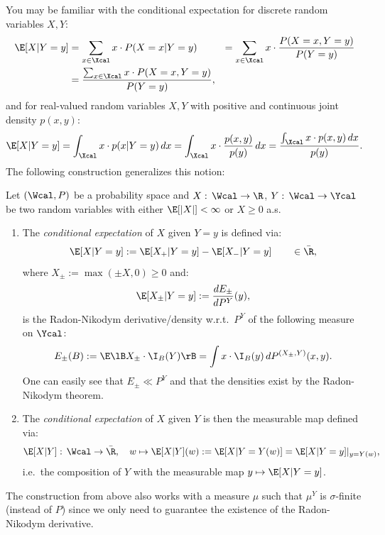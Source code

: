 You may be familiar with the conditional expectation for discrete random variables $X,Y$:
\begin{align*} 
    \E[X|Y=y] &= \sum_{x\in\Xcal} x\cdot P(X=x|Y=y) 
&= \sum_{x \in \Xcal} x \cdot \frac{P(X=x,Y=y)}{P(Y=y)} \\&= \frac{\sum_{x \in \Xcal} x \cdot P(X=x,Y=y)}{P(Y=y)},
\end{align*}
and for real-valued random variables $X,Y$ with positive and continuous joint density $p(x,y)$: 
\[\E[X| Y=y] = \int_\Xcal x \cdot p(x| Y=y) \,dx = \int_\Xcal x \cdot \frac{p(x,y)}{p(y)} \,dx = \frac{\int_\Xcal x \cdot p(x,y)\,dx}{p(y)}.\]
The following construction generalizes this notion:
\begin{Def}
    Let $(\Wcal,P)$ be a probability space
    and $X:\, \Wcal \to \R$, $Y:\,\Wcal \to \Ycal$ be two random variables with 
    either $\E[|X|]< \infty$ or $X \ge 0$ a.s.
\begin{enumerate}
         \item     The \emph{conditional expectation}  of $X$ given $Y=y$ is defined via:
     \[ \E[X|Y=y] := \E[X_+|Y=y] - \E[X_-|Y=y] \qquad \in \bar \R, \]
     where $X_\pm:=\max(\pm X,0) \ge 0$ and:
     \[\E[X_\pm|Y=y] := \frac{dE_\pm}{dP^Y}(y),\]
     is the Radon-Nikodym derivative/density w.r.t.\ $P^Y$ of the following measure on $\Ycal$: 
     \[ E_\pm(B) := \E\lB X_\pm \cdot \I_B(Y) \rB = \int x \cdot \I_B(y) \, dP^{(X_\pm,Y)}(x,y).  \]
     One can easily see that $E_\pm \ll P^Y$ and that the densities exist by the Radon-Nikodym theorem.
 \item The \emph{conditional expectation}  of $X$ given $Y$ is then the measurable map defined via:
     \[\E[X| Y] :\, \Wcal \to \bar\R,\quad w \mapsto \E[X|Y](w):=\E[X|Y=Y(w)]=\E[X|Y=y]|_{y=Y(w)},\]
     i.e.\ the composition of $Y$ with the measurable map $y \mapsto\E[X|Y=y]$.
\end{enumerate}    
\end{Def}

\begin{Rem}
    The construction from above also works with a measure $\mu$ such that $\mu^Y$ is $\sigma$-finite (instead of $P$) since we only need to guarantee the existence of the Radon-Nikodym derivative.
\end{Rem}

